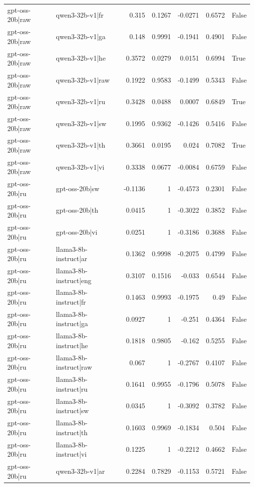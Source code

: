 \begin{table}
\begin{tabular}{l l r r r r l}
gpt-oss-20b|raw & qwen3-32b-v1|fr & 0.315 & 0.1267 & -0.0271 & 0.6572 & False \\
gpt-oss-20b|raw & qwen3-32b-v1|ga & 0.148 & 0.9991 & -0.1941 & 0.4901 & False \\
gpt-oss-20b|raw & qwen3-32b-v1|he & 0.3572 & 0.0279 & 0.0151 & 0.6994 & True \\
gpt-oss-20b|raw & qwen3-32b-v1|raw & 0.1922 & 0.9583 & -0.1499 & 0.5343 & False \\
gpt-oss-20b|raw & qwen3-32b-v1|ru & 0.3428 & 0.0488 & 0.0007 & 0.6849 & True \\
gpt-oss-20b|raw & qwen3-32b-v1|sw & 0.1995 & 0.9362 & -0.1426 & 0.5416 & False \\
gpt-oss-20b|raw & qwen3-32b-v1|th & 0.3661 & 0.0195 & 0.024 & 0.7082 & True \\
gpt-oss-20b|raw & qwen3-32b-v1|vi & 0.3338 & 0.0677 & -0.0084 & 0.6759 & False \\
gpt-oss-20b|ru & gpt-oss-20b|sw & -0.1136 & 1 & -0.4573 & 0.2301 & False \\
gpt-oss-20b|ru & gpt-oss-20b|th & 0.0415 & 1 & -0.3022 & 0.3852 & False \\
gpt-oss-20b|ru & gpt-oss-20b|vi & 0.0251 & 1 & -0.3186 & 0.3688 & False \\
gpt-oss-20b|ru & llama3-8b-instruct|ar & 0.1362 & 0.9998 & -0.2075 & 0.4799 & False \\
gpt-oss-20b|ru & llama3-8b-instruct|eng & 0.3107 & 0.1516 & -0.033 & 0.6544 & False \\
gpt-oss-20b|ru & llama3-8b-instruct|fr & 0.1463 & 0.9993 & -0.1975 & 0.49 & False \\
gpt-oss-20b|ru & llama3-8b-instruct|ga & 0.0927 & 1 & -0.251 & 0.4364 & False \\
gpt-oss-20b|ru & llama3-8b-instruct|he & 0.1818 & 0.9805 & -0.162 & 0.5255 & False \\
gpt-oss-20b|ru & llama3-8b-instruct|raw & 0.067 & 1 & -0.2767 & 0.4107 & False \\
gpt-oss-20b|ru & llama3-8b-instruct|ru & 0.1641 & 0.9955 & -0.1796 & 0.5078 & False \\
gpt-oss-20b|ru & llama3-8b-instruct|sw & 0.0345 & 1 & -0.3092 & 0.3782 & False \\
gpt-oss-20b|ru & llama3-8b-instruct|th & 0.1603 & 0.9969 & -0.1834 & 0.504 & False \\
gpt-oss-20b|ru & llama3-8b-instruct|vi & 0.1225 & 1 & -0.2212 & 0.4662 & False \\
gpt-oss-20b|ru & qwen3-32b-v1|ar & 0.2284 & 0.7829 & -0.1153 & 0.5721 & False \\

\end{tabular}
\end{table}
